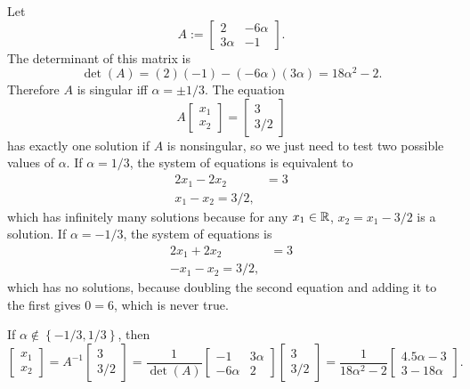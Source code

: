 \documentclass{article}
\begin{document}
\bigskip
\begin{prob}
\end{prob}
Let
        \[ A := \begin{bmatrix}
            2 & -6\alpha \\
            3\alpha & -1
        \end{bmatrix}. \]
The determinant of this matrix is
        \[ \det(A) = (2)(-1)-(-6\alpha)(3\alpha)=18\alpha^2-2. \]
Therefore $A$ is singular iff $\alpha=\pm 1/3$. The equation
\[ A \begin{bmatrix}
    x_1 \\
    x_2
\end{bmatrix} = \begin{bmatrix}
    3 \\
    3/2
\end{bmatrix} \]
has exactly one solution if $A$ is nonsingular, so we just need to test two possible values of $\alpha$. If $\alpha=1/3$, the system of equations is equivalent to
\begin{align*}
    2 x_1 - 2 x_2 &= 3 \\
    x_1 - x_2 = 3/2,
\end{align*}
which has infinitely many solutions because for any $x_1 \in \mathbb{R}$, $x_2=x_1-3/2$ is a solution. If $\alpha=-1/3$, the system of equations is
\begin{align*}
    2 x_1 + 2 x_2 &= 3 \\
    -x_1 - x_2 = 3/2,
\end{align*}
which has no solutions, because doubling the second equation and adding it to the first gives $0=6$, which is never true.
\par
If $\alpha \not\in \left\{ -1/3,1/3 \right\}$, then
\[ \begin{bmatrix}
    x_1 \\
    x_2
\end{bmatrix} = A^{-1} \begin{bmatrix}
    3 \\
    3/2
    \end{bmatrix} = \frac{1}{\det(A)} \begin{bmatrix}
    -1 & 3\alpha \\
    -6\alpha & 2
\end{bmatrix} \begin{bmatrix}
    3 \\
    3/2
\end{bmatrix} = \frac{1}{18\alpha^2-2} \begin{bmatrix}
    4.5\alpha-3 \\
    3-18\alpha
\end{bmatrix}. \]
\end{document}
